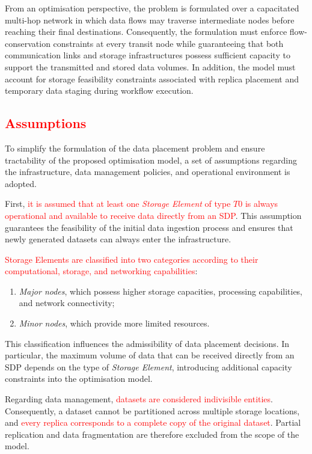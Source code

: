 \documentclass[a4paper,fleqn]{cas-dc}
\begin{document}
From an optimisation perspective, the problem is formulated over a capacitated multi-hop network in which data flows may traverse intermediate nodes before reaching their final destinations. Consequently, the formulation must enforce flow-conservation constraints at every transit node while guaranteeing that both communication links and storage infrastructures possess sufficient capacity to support the transmitted and stored data volumes. In addition, the model must account for storage feasibility constraints associated with replica placement and temporary data staging during workflow execution.

\subsection{\textcolor{red}{Assumptions}}

To simplify the formulation of the data placement problem and ensure tractability of the proposed optimisation model, a set of assumptions regarding the infrastructure, data management policies, and operational environment is adopted.

First, \textcolor{red}{it is assumed that at least one \emph{Storage Element} of type \(T0\) is always operational and available to receive data directly from an SDP}. This assumption guarantees the feasibility of the initial data ingestion process and ensures that newly generated datasets can always enter the infrastructure.

\textcolor{red}{Storage Elements are classified into two categories according to their computational, storage, and networking capabilities}:
\begin{enumerate}
    \item \emph{Major nodes}, which possess higher storage capacities, processing capabilities, and network connectivity;
    \item \emph{Minor nodes}, which provide more limited resources.
\end{enumerate}

This classification influences the admissibility of data placement decisions. In particular, the maximum volume of data that can be received directly from an SDP depends on the type of \emph{Storage Element}, introducing additional capacity constraints into the optimisation model.

Regarding data management, \textcolor{red}{datasets are considered indivisible entities}. Consequently, a dataset cannot be partitioned across multiple storage locations, and \textcolor{red}{every replica corresponds to a complete copy of the original dataset}. Partial replication and data fragmentation are therefore excluded from the scope of the model.
\end{document}
